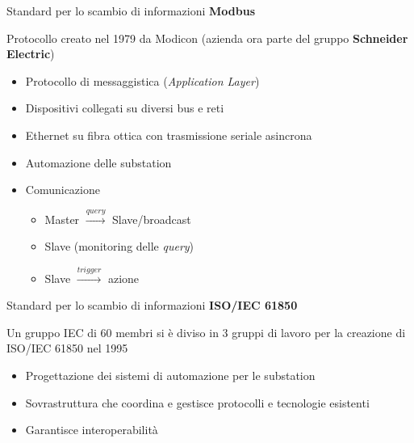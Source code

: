 \begin{frame}{Standard per lo scambio di informazioni}
	\textbf{Modbus}
	\begin{block}{}
	Protocollo creato nel 1979 da Modicon (azienda ora parte del gruppo \textbf{\color{blue_slides}Schneider Electric})
	\end{block}
	\pause
	\begin{itemize}[<+- | alert@+>]
		\item Protocollo di messaggistica (\textit{Application Layer})%
		\item Dispositivi collegati su diversi bus e reti%
		\item Ethernet su fibra ottica con trasmissione seriale asincrona%
		\item Automazione delle substation%
		\item Comunicazione
			\begin{itemize}[<+- | alert@+>]
			\item Master $\xrightarrow{query}$ Slave/broadcast
			\item Slave (monitoring delle \textit{query})
			\item Slave $\xrightarrow{trigger}$ azione
			\end{itemize}
	\end{itemize}
\end{frame}


\begin{frame}{Standard per lo scambio di informazioni}
	\textbf{ISO/IEC 61850}
	\begin{block}{}
		Un gruppo IEC di 60 membri si è diviso in 3 gruppi di lavoro per la creazione di ISO/IEC 61850 nel 1995
	\end{block}
	\pause
	\begin{itemize}[<+- | alert@+>]
		\item Progettazione dei sistemi di automazione per le substation
		\item Sovrastruttura che coordina e gestisce protocolli e tecnologie esistenti
		\item Garantisce interoperabilità
	\end{itemize}
\end{frame}


